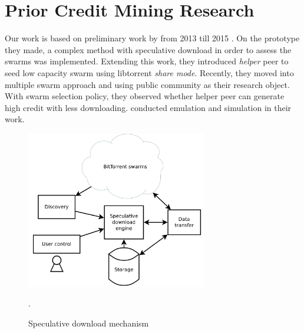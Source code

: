 %



\section{Prior Credit Mining Research}
\label{section:cmprior}
Our work is based on preliminary work by \citeauthor{2015:creditmining:capota} from 2013 till 2015 \cite{2015:creditmining:capota, 2013:investmentcm:capota, 2014:bwmarket:capota}. On the prototype they made, a complex method with speculative download in order to assess the swarms was implemented\cite{2013:investmentcm:capota}. Extending this work, they introduced \textit{helper} peer to seed low capacity swarm using libtorrent \textit{share mode}\cite{2014:bwmarket:capota}. Recently, they moved into multiple swarm approach and using public community as their research object. With swarm selection policy, they observed whether helper peer can generate high credit with less downloading\cite{2015:creditmining:capota}. \citeauthor{2015:creditmining:capota} conducted emulation and simulation in their work.

\begin{figure}[h]
	\centering
	\includegraphics[width=0.7\textwidth]{pics/SDE2013.png}
	\caption{Speculative download mechanism \cite{2013:investmentcm:capota}}.
	\label{fig:sde13}
\end{figure}

